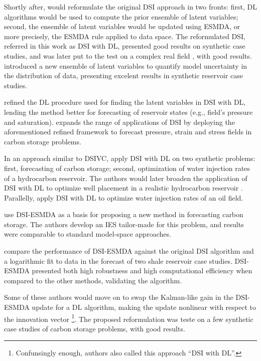     Shortly after,  would reformulate the original DSI approach in two fronts:
    first, DL algorithms would be used to compute the prior ensemble of latent variables;
    second, the ensemble of latent variables would be updated using ESMDA,
    or more precisely, the ESMDA rule applied to data space.
    The reformulated DSI, referred in this work as DSI with DL,
    presented good results on synthetic case studies, 
    and was later put to the test on a complex real field 
    \cite{Jiang:2021:Frontiers}, with good results.
     introduced a new ensemble of latent variables 
    to quantify model uncertainty in the distribution of data, 
    presenting excelent results in synthetic reservoir case studies.
    
     refined the DL procedure used for finding the latent variables in DSI with DL,
    lending the method better for forecasting of reservoir states (e.g., field's pressure and saturation).
     expands the range of applications of DSI by deploying the aforementioned refined framework 
    to forecast pressure, strain and stress fields in carbon storage problems.

    In an approach similar to DSIVC,
    apply DSI with DL on two synthetic problems:
    first, forecasting of carbon storage; 
    second, optimization of water injection rates of a hydrocarbon reservoir.
    The authors 
    would later broaden the application of DSI with DL to 
    optimize well placement in a realistic hydrocarbon reservoir
    \cite{Barros:2025}. 
    Parallelly,  apply DSI with DL to optimize water injection rates of an oil field.

     use DSI-ESMDA as a basis for proposing a new method in forecasting carbon storage.
    The authors develop an IES tailor-made for this problem, and results were comparable to standard model-space approaches. 
    
     compare the performance of DSI-ESMDA against 
    the original DSI algorithm and a logarithmic fit to data \cite{Duong:2010}
    in the forecast of two shale reservoir case studies.
    DSI-ESMDA presented both high robustness and high computational efficiency 
    when compared to the other methods, validating the algorithm. 

    Some of these authors would move on to swap the Kalman-like gain in the DSI-ESMDA update 
    for a DL algorithm, making the update nonlinear with respect to the innovation vector
    \footnote{%
        Confunsingly enough, authors also called this approach ``DSI with DL''.
    }.
    The proposed reformulation was teste on a few synthetic case studies of carbon storage problems, with good results.

